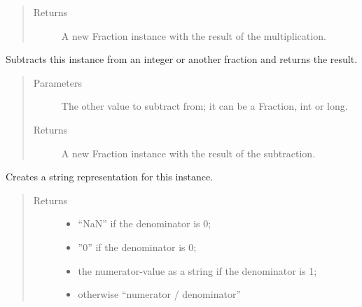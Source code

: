 \documentclass[letterpaper,10pt,english]{sphinxmanual}
\begin{document}
\begin{fulllineitems}
\begin{fulllineitems}
\begin{quote}
\begin{description}
\item[{Returns}] \leavevmode
A new Fraction instance with the result of the multiplication.

\end{description}\end{quote}

\end{fulllineitems}


\begin{fulllineitems}
\label{\detokenize{fraction:fraction.Fraction.__rsub__}}
Subtracts this instance from an integer or another fraction and returns the result.
\begin{quote}\begin{description}
\item[{Parameters}] \leavevmode
{} \textendash{} The other value to subtract from; it can be a Fraction, int or long.

\item[{Returns}] \leavevmode
A new Fraction instance with the result of the subtraction.

\end{description}\end{quote}

\end{fulllineitems}


\begin{fulllineitems}
\label{\detokenize{fraction:fraction.Fraction.__str__}}
Creates a string representation for this instance.
\begin{quote}\begin{description}
\item[{Returns}] \leavevmode
\begin{itemize}
\item {} 
“NaN” if the denominator is 0;

\item {} 
”0” if the denominator is 0;

\item {} 
the numerator-value as a string if the denominator is 1;

\item {} 
otherwise “numerator / denominator”


\end{itemize}
\end{description}
\end{quote}
\end{fulllineitems}
\end{fulllineitems}
\end{document}
